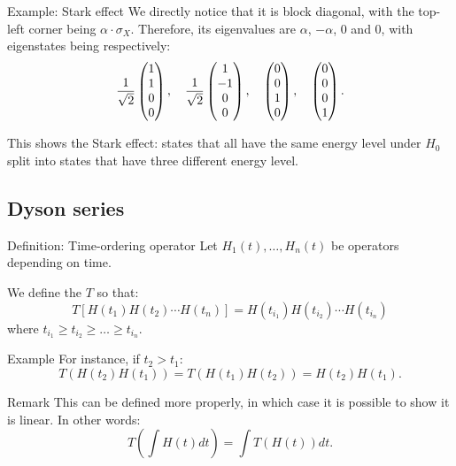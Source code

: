\documentclass[a4paper]{article}
\begin{document}
\begin{parag}{Example: Stark effect}
    We directly notice that it is block diagonal, with the top-left corner being $\alpha\cdot \sigma_X$. Therefore, its eigenvalues are $\alpha$, $-\alpha$, $0$ and $0$, with eigenstates being respectively: 
    \[\frac{1}{\sqrt{2}} \begin{pmatrix} 1 \\ 1 \\ 0 \\ 0 \end{pmatrix}, \quad \frac{1}{\sqrt{2}} \begin{pmatrix} 1 \\ -1 \\ 0 \\ 0 \end{pmatrix}, \quad \begin{pmatrix} 0 \\ 0 \\ 1 \\ 0 \end{pmatrix}, \quad \begin{pmatrix} 0 \\ 0 \\ 0 \\ 1 \end{pmatrix}.\]
    
    This shows the Stark effect: states that all have the same energy level under $H_0$ split into states that have three different energy level. 
\end{parag}

\subsection{Dyson series}

\begin{parag}{Definition: Time-ordering operator}
    Let $H_1\left(t\right), \ldots, H_n\left(t\right)$ be operators depending on time.
    
    We define the  $T$ so that:
    \[T\left[H\left(t_1\right) H\left(t_2\right) \cdots H\left(t_n\right)\right] = H\left(t_{i_1}\right) H\left(t_{i_2}\right) \cdots H\left(t_{i_n}\right)\]
    where $t_{i_1} \geq t_{i_2} \geq \ldots \geq t_{i_n}$.

    \begin{subparag}{Example}
        For instance, if $t_2 > t_1$: 
        \[T\left(H\left(t_2\right) H\left(t_1\right)\right) = T\left(H\left(t_1\right) H\left(t_2\right)\right) = H\left(t_2\right) H\left(t_1\right).\]
    \end{subparag}

    \begin{subparag}{Remark}
        This can be defined more properly, in which case it is possible to show it is linear. In other words: 
        \[T\left(\int H\left(t\right) dt\right) = \int T\left(H\left(t\right)\right) dt.\]
    \end{subparag}
\end{parag}
\end{document}

